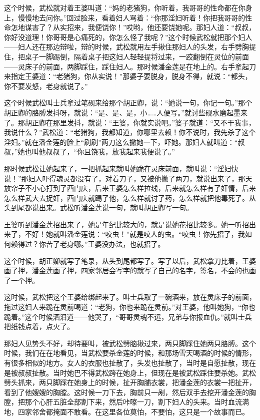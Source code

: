 \par 这个时候，武松就对着王婆叫道：“妈的老猪狗，你听着，我哥哥的性命都在你身上，慢慢地去问你。”回过脸来，看着妇人骂着：“你那淫妇听着！你把我哥哥的性命怎地谋害了？从实招来，我便饶你！”哎哟，他还要饶她呢。那妇人道：“叔叔，你好没道理！你哥哥是心痛死的，你怎么怪了我呢？”这个时候武松就把那个妇人——妇人还在那边辩啦，辩的时候，武松就用左手揪住那妇人的头发，右手劈胸提住，把桌子一脚踢倒，隔着桌子把这妇人轻轻提将过来，一跤翻倒在灵位的前面——灵床子的前面，两脚踩住，踩住妇人。那时候潘金莲是在地上的。右手拿起刀来指定王婆道：“老猪狗，你从实说！”那婆子要脱身，脱身不得，就说：“都头，你不要发怒，老身就说了。”
\par 这个时候武松叫士兵拿过笔砚来给那个胡正卿，说：“她说一句，你记一句。”那个胡正卿的胳膊发抖呀，就说：“是、是、是，小……人便写。”就讨些砚水磨起墨来了。那胡正卿在那里发抖，就说：“王婆，你就实说吧。”婆子就道：“又不干我事，我说什么？”武松道：“老猪狗，我都知道，你哪里去赖！你不说时，我先杀了这个淫妇。”就在潘金莲的脸上“刷刷”两刀这么撇她一下，吓她。那妇人就叫道：“叔叔，”她也叫他叔叔了，“你且饶我，放我起来我便说了。”
\par 那时候武松让她起来了，一把抓起来就叫她跪在灵床前面，就叫说：“淫妇快说！”那妇人吓得魂灵都没有了，对着刀子，又被他撇了两刀，就说出来了，那天放帘子不小心打到了西门庆，后来王婆怎么样拉线，后来就怎么样有了奸情，后来怎么样武大去捉奸，西门庆就踢了他，怎么样就讨了药，怎么样就把他毒死了。从头到尾都说出来。武松听潘金莲说一句，就叫胡正卿写一句。
\par 王婆听到潘金莲招出来了，她是年纪比较大的，就是说她花招比较多。她一听招出来了，不好！她就叫潘金莲说：“咬虫！”就是咬人的虫。“咬虫！你先招了，我如何赖得过？你苦了老身哪。”王婆没办法，也就招了。
\par 这个时候，胡正卿就写了笔录，从头到尾都写了。写了以后，武松拿刀比着，王婆画了押，潘金莲画了押，四家邻居会写字的就写了自己的名字，签名，不会的也画了一个押。
\par 这时候，武松把这个王婆给绑起来了。叫士兵取了一碗酒来，放在灵床子的前面，拖过这妇人来跪在灵前喝道：“老狗，你也来跪在灵前。”对王婆，他叫她狗，“你也跪着。”这个时候洒泪道——他哭了，“哥哥灵魂不远，兄弟与你报血仇。”就叫士兵把纸钱点着，点火了。
\par 那妇人见势头不好，却待要叫，被武松劈脑揪过来，两只脚踩住她两只胳膊。这个时候，我们在在地看见，当武松要杀金莲的时候，和那场雪天喝酒的时候的情形，有很多相似的地方。女人的衣服也扯散了，头发也扯散了，当时是自愿扯散，现在是被叔叔扯散。当时她巴不得武松跨在她身上，但现在是被武松踩住要杀她。武松劈头抓来，两只脚踩在她身上的时候，扯开胸脯衣裳，把潘金莲的衣裳一把扯开，看到了他嫂嫂的胸膛。这时候一刀下去，胸前只一剐，然后双手去挖开潘金莲的胸膛，把那个心肝五脏全部割下来，然后咔嚓一刀，割下妇人的头来。当时血流满地，四家邻舍都掩面不敢看。在这里各位莫怕，不要怕，这只是一个故事而已。
